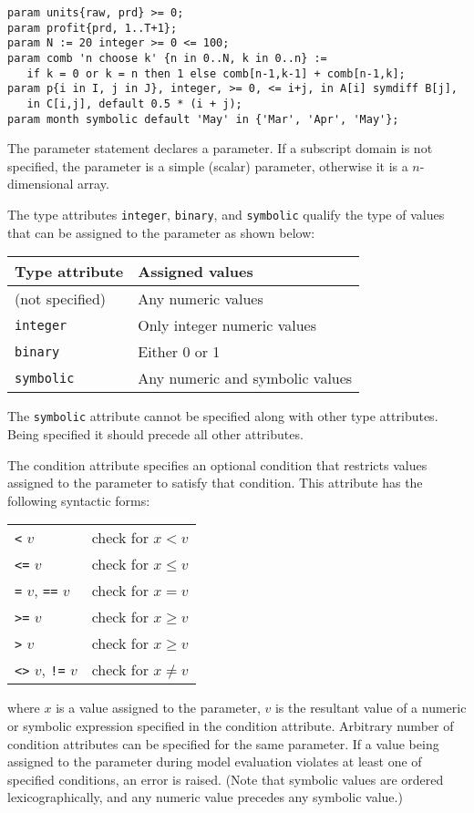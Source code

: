 \documentclass[11pt]{report}
\def\para#1{\noindent{\bf#1}}
\begin{document}
\para{Examples}

\begin{verbatim}
param units{raw, prd} >= 0;
param profit{prd, 1..T+1};
param N := 20 integer >= 0 <= 100;
param comb 'n choose k' {n in 0..N, k in 0..n} :=
   if k = 0 or k = n then 1 else comb[n-1,k-1] + comb[n-1,k];
param p{i in I, j in J}, integer, >= 0, <= i+j, in A[i] symdiff B[j],
   in C[i,j], default 0.5 * (i + j);
param month symbolic default 'May' in {'Mar', 'Apr', 'May'};
\end{verbatim}

The parameter statement declares a parameter. If a subscript domain is
not specified, the parameter is a simple (scalar) parameter, otherwise
it is a $n$-dimensional array.

The type attributes {\tt integer}, {\tt binary}, and {\tt symbolic}
qualify the type of values that can be assigned to the parameter as
shown below:

\noindent\hfil
\begin{tabular}{@{}ll@{}}
Type attribute&Assigned values\\
\hline
(not specified)&Any numeric values\\
{\tt integer}&Only integer numeric values\\
{\tt binary}&Either 0 or 1\\
{\tt symbolic}&Any numeric and symbolic values\\
\end{tabular}

The {\tt symbolic} attribute cannot be specified along with other type
attributes. Being specified it should precede all other attributes.

The condition attribute specifies an optional condition that restricts
values assigned to the parameter to satisfy that condition. This
attribute has the following syntactic forms:

\begin{tabular}{@{}ll@{}}
{\tt<} $v$&check for $x<v$\\
{\tt<=} $v$&check for $x\leq v$\\
{\tt=} $v$, {\tt==} $v$&check for $x=v$\\
{\tt>=} $v$&check for $x\geq v$\\
{\tt>} $v$&check for $x\geq v$\\
{\tt<>} $v$, {\tt!=} $v$&check for $x\neq v$\\
\end{tabular}

\noindent where $x$ is a value assigned to the parameter, $v$ is the
resultant value of a numeric or symbolic expression specified in the
condition attribute. Arbitrary number of condition attributes can be
specified for the same parameter. If a value being assigned to the
parameter during model evaluation violates at least one of specified
conditions, an error is raised. (Note that symbolic values are ordered
lexicographically, and any numeric value precedes any symbolic value.)
\end{document}
